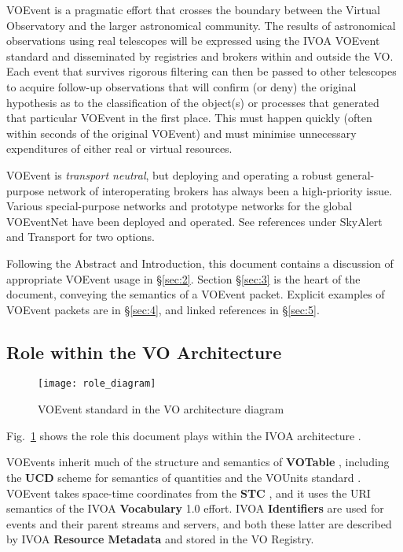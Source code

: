 \documentclass[11pt,a4paper]{ivoa}
\begin{document}
VOEvent is a pragmatic effort that crosses the boundary between the Virtual
Observatory and the larger astronomical community. The results of astronomical
observations using real telescopes will be expressed using the IVOA VOEvent
standard and disseminated by registries and brokers within and outside the VO.
Each event that survives rigorous filtering can then be passed to other
telescopes to acquire follow-up observations that will confirm (or deny) the
original hypothesis as to the classification of the object(s) or processes that
generated that particular VOEvent in the first place. This must happen quickly
(often within seconds of the original VOEvent) and must minimise unnecessary
expenditures of either real or virtual resources.

VOEvent is \emph{transport neutral}, but deploying and operating a robust
general-purpose network of interoperating brokers has always been a
high-priority issue. Various special-purpose networks and prototype networks
for the global VOEventNet have been deployed and operated. See references under
SkyAlert \citep{bib05} and Transport \citep{bib33} for two options.

Following the Abstract and Introduction, this document contains a discussion of
appropriate VOEvent usage in \S\ref{sec:2}. Section \S\ref{sec:3} is the heart
of the document, conveying the semantics of a VOEvent packet. Explicit examples
of VOEvent packets are in \S\ref{sec:4}, and linked references in \S\ref{sec:5}.

\subsection{Role within the VO Architecture}

\begin{figure}[ht!]
\centering\texttt{[image: role\_diagram]}
\caption{VOEvent standard in the VO architecture diagram}
\label{fig:diagram}
\end{figure}

Fig.~\ref{fig:diagram} shows the role this document plays within the
IVOA architecture \citep{2021ivoa.spec.1101D}.

VOEvents inherit much of the structure and semantics of {\bf
VOTable} \citep{2019ivoa.spec.1021O}, including the {\bf UCD}
\citep{2018ivoa.spec.0527P} scheme for semantics of quantities and the VOUnits
standard \citep{2023ivoa.spec.1215G}. VOEvent takes space-time coordinates from
the {\bf STC} \citep{2007ivoa.spec.1030R}, and it uses the URI semantics of the
IVOA {\bf Vocabulary} 1.0 \citep{2009ivoa.spec.1007G} effort. IVOA {\bf Identifiers}
\citep{2016ivoa.spec.0523D} are used for events and their parent streams and
servers, and both these latter are described by IVOA {\bf Resource Metadata}
\citep{2007ivoa.spec.0302H} and stored in the VO Registry.
\end{document}
